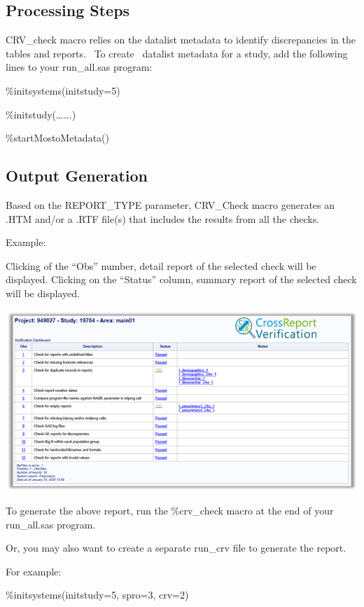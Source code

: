 \documentclass[
  letterpaper,
  DIV=11,
  numbers=noendperiod]{scrartcl}
\begin{document}
\hypertarget{processing-steps}{%
\subsection{Processing Steps}\label{processing-steps}}

CRV\_check macro relies on the datalist metadata to identify
discrepancies in the tables and reports.~ To create ~datalist metadata
for a study, add the following lines to your run\_all.sas program:

\%initsystems(initstudy=5)

\%initstudy(\ldots\ldots.)

\%startMostoMetadata()

\hypertarget{output-generation}{%
\subsection{Output Generation}\label{output-generation}}

Based on the REPORT\_TYPE parameter, CRV\_Check macro generates an .HTM
and/or a .RTF file(s) that includes the results from all the checks.

Example:

Clicking of the ``Obs'' number, detail report of the selected check will
be displayed. Clicking on the ``Status'' column, summary report of the
selected check will be displayed. ~

\includegraphics{image/Picture15.png}

To generate the above report, run the \%crv\_check macro at the end of
your run\_all.sas program.

Or, you may also want to create a separate run\_crv file to generate the
report.

For example:

\%initsystems(initstudy=5, spro=3, crv=2)
\end{document}
